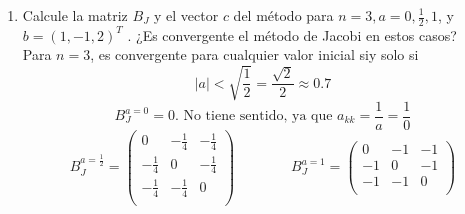 \documentclass[12pt]{article}
\begin{document}
\begin{ejercicio} 
\begin{enumerate}
        Por tanto, sus valores propios son: $\sigma(B_J)=\{a^2, -(n-1)a^2\}$.

        Para que el sistema sea convergente para cualquier valor de $x^{(0)}$ inicial, es necesario que $\rho(B_J)<1$. Por tanto,
        \begin{equation*}
            |a^2|=a^2<1 \Longrightarrow |a|<1
        \end{equation*}
        \begin{equation*}
            |-(n-1)a^2|=(n-1)a^2<1 \Longrightarrow a^2 < \frac{1}{n-1} \Longrightarrow |a| < \sqrt{\frac{1}{n-1}}
        \end{equation*}

        Sin embargo, podemos ver que
        \begin{equation*}
            \sqrt{\frac{1}{n-1}} \leq 1 \Longleftrightarrow \frac{1}{n-1} \leq 1 \Longleftrightarrow 1 \leq n-1 \Longleftrightarrow 2 \leq n\text{, trivialmente cierto}
        \end{equation*}

        Por tanto, para que sea convergente es necesario que:
        \begin{equation*}
            |a| < \sqrt{\frac{1}{n-1}}
        \end{equation*}
        
        \item Calcule la matriz $B_J$ y el vector $c$ del método para $n = 3, a = 0,\frac{1}{2},1$, y $b = (1,-1, 2)^T$ . ¿Es convergente el método de Jacobi en estos casos?\\

        Para $n=3$, es convergente para cualquier valor inicial siy solo si $$|a|<\sqrt{\frac{1}{2}} = \frac{\sqrt{2}}{2}\approx 0.7$$
        \begin{equation*}
            B_J^{a=0} = 0.\text{ No tiene sentido, ya que } a_{kk}=\frac{1}{a}=\frac{1}{0}
        \end{equation*}
        \begin{equation*}
            B_J^{a=\frac{1}{2}} = \left( \begin{array}{ccc}
                0 & -\frac{1}{4} & -\frac{1}{4} \\
                -\frac{1}{4} & 0 & -\frac{1}{4} \\
                -\frac{1}{4} & -\frac{1}{4} & 0\\
            \end{array}\right)\qquad \qquad
            B_J^{a=1} = \left( \begin{array}{ccc}
                0 & -1 & -1 \\
                -1 & 0 & -1 \\
                -1 & -1 & 0\\
            \end{array}\right)
        \end{equation*}
    \end{enumerate}


\end{ejercicio}
\end{document}
